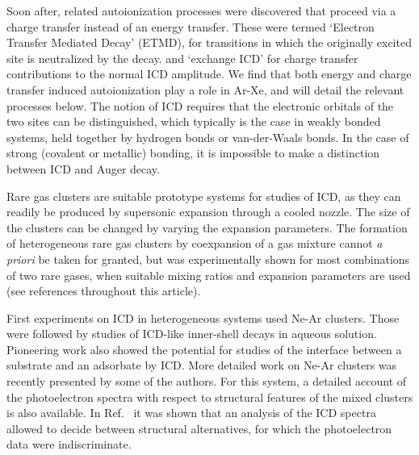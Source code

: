 Soon after, related 
autoionization processes were discovered that proceed via a 
charge transfer instead of an energy transfer. 
These were termed `Electron Transfer Mediated Decay' 
 (ETMD),\cite{zobeley,mueller,sakai,foerstel} for transitions in 
 which the originally excited site is neutralized by the decay.
 and `exchange ICD' for charge transfer contributions to the 
 normal ICD amplitude.\cite{santrarev,jahnkesat}
We find that both energy and charge transfer induced 
autoionization play a role in Ar-Xe, and will detail the 
relevant processes below. The notion of ICD requires that the 
electronic orbitals of the two sites can be distinguished, which 
typically is the case in weakly bonded systems, held together by 
hydrogen bonds or van-der-Waals bonds. In the case of strong
(covalent or metallic) bonding, it is impossible to make a
distinction between ICD and Auger decay.\cite{hergenhahn_review}

Rare gas clusters are suitable prototype systems for studies of
ICD, as they can readily be produced by supersonic 
expansion through a cooled nozzle. 
The size of the clusters can be changed by varying the expansion parameters.
The formation of heterogeneous rare gas clusters by coexpansion of a gas mixture cannot {\it a priori} be taken for granted, but was experimentally shown for most combinations of two rare gases, when suitable mixing ratios and expansion parameters are used (see references throughout this article).

First experiments on ICD in heterogeneous systems used Ne-Ar 
clusters.\cite{barthnear} Those were followed by studies of 
ICD-like inner-shell decays in aqueous solution.\cite{aziz,pokapanich,pokapanich2011}
Pioneering work also showed the 
potential for studies of the interface between a substrate and an 
adsorbate by ICD.\cite{grieves} More detailed work on Ne-Ar 
clusters was recently presented by some of the authors.\cite{
fasshauer2014} For this system, a detailed account of the
photoelectron spectra with respect to structural features of the 
mixed clusters is also available.\cite{lundwall} In Ref.\  it was shown that an analysis of the ICD spectra 
allowed to decide between structural alternatives, for which the 
photoelectron data were indiscriminate.

